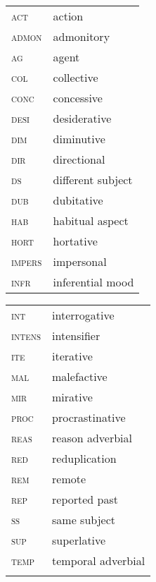 \documentclass[output=paper,
modfonts,nonflat
]{langsci/langscibook}
\begin{document}
\begin{tabularx}{.45\textwidth}{lX}
\textsc{act} & action \\
\textsc{admon} & admonitory \\
\textsc{ag} & agent \\
\textsc{col} & collective \\
\textsc{conc} & concessive \\
\textsc{desi} & desiderative \\
\textsc{dim} & diminutive \\
\textsc{dir } & directional \\
\textsc{ds } & different subject\\
\textsc{dub} & dubitative\\
\textsc{hab} & habitual aspect\\
\textsc{hort} & hortative \\
\textsc{impers} & impersonal \\
\textsc{infr} & inferential mood \\
\end{tabularx}
\begin{tabularx}{.45\textwidth}{lX}
\textsc{int} & interrogative \\
\textsc{intens } & intensifier \\
\textsc{ite} & iterative \\
\textsc{mal} & malefactive \\
\textsc{mir} & mirative \\
\textsc{proc} & procrastinative \\
\textsc{reas} & reason adverbial \\
\textsc{red } & reduplication \\
\textsc{rem} & remote \\
\textsc{rep} & reported past \\
\textsc{ss} & same subject\\
\textsc{sup} & superlative \\
\textsc{temp} & temporal adverbial \\
\\
\end{tabularx}

{\sloppy
\printbibliography[heading=subbibliography,notkeyword=this]
}
\end{document}
